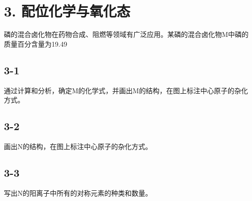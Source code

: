 \section*{3. 配位化学与氧化态}
磷的混合⻧化物在药物合成、阻燃等领域有⼴泛应⽤。某磷的混合⻧化物M中磷的质量百分含量为19.49%

\subsection*{3-1}
通过计算和分析，确定M的化学式，并画出M的结构，在图上标注中⼼原⼦的杂化⽅式。

\subsection*{3-2}
画出N的结构，在图上标注中⼼原⼦的杂化⽅式。

\subsection*{3-3}
写出N的阳离⼦中所有的对称元素的种类和数量。
